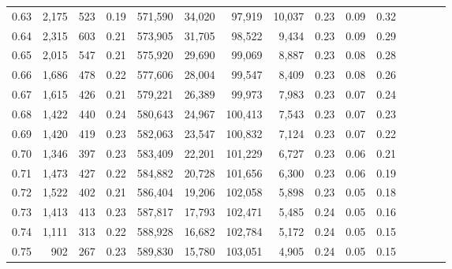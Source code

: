 \begin{tabular}{rrrcrrrrrrrrrrr}
0.63 &   2,175 &     523 &                                       0.19 &  571,590 &   34,020 &   97,919 &   10,037 &  0.23 &  0.09 &                         0.32 \\
0.64 &   2,315 &     603 &                                       0.21 &  573,905 &   31,705 &   98,522 &    9,434 &  0.23 &  0.09 &                         0.29 \\
0.65 &   2,015 &     547 &                                       0.21 &  575,920 &   29,690 &   99,069 &    8,887 &  0.23 &  0.08 &                         0.28 \\
0.66 &   1,686 &     478 &                                       0.22 &  577,606 &   28,004 &   99,547 &    8,409 &  0.23 &  0.08 &                         0.26 \\
0.67 &   1,615 &     426 &                                       0.21 &  579,221 &   26,389 &   99,973 &    7,983 &  0.23 &  0.07 &                         0.24 \\
0.68 &   1,422 &     440 &                                       0.24 &  580,643 &   24,967 &  100,413 &    7,543 &  0.23 &  0.07 &                         0.23 \\
0.69 &   1,420 &     419 &                                       0.23 &  582,063 &   23,547 &  100,832 &    7,124 &  0.23 &  0.07 &                         0.22 \\
0.70 &   1,346 &     397 &                                       0.23 &  583,409 &   22,201 &  101,229 &    6,727 &  0.23 &  0.06 &                         0.21 \\
0.71 &   1,473 &     427 &                                       0.22 &  584,882 &   20,728 &  101,656 &    6,300 &  0.23 &  0.06 &                         0.19 \\
0.72 &   1,522 &     402 &                                       0.21 &  586,404 &   19,206 &  102,058 &    5,898 &  0.23 &  0.05 &                         0.18 \\
0.73 &   1,413 &     413 &                                       0.23 &  587,817 &   17,793 &  102,471 &    5,485 &  0.24 &  0.05 &                         0.16 \\
0.74 &   1,111 &     313 &                                       0.22 &  588,928 &   16,682 &  102,784 &    5,172 &  0.24 &  0.05 &                         0.15 \\
0.75 &     902 &     267 &                                       0.23 &  589,830 &   15,780 &  103,051 &    4,905 &  0.24 &  0.05 &                         0.15 \\

\end{tabular}
